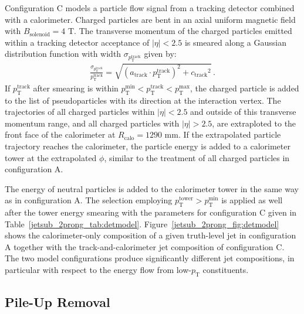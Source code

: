 \documentclass[11pt,letterpaper]{article}
\begin{document}
Configuration C models a particle flow signal from a tracking detector combined with a calorimeter. 
Charged particles are bent in an axial uniform magnetic field with $B_{\text{solenoid}} = 4$ T.
The transverse momentum of the charged particles emitted within a tracking detector acceptance of $|\eta|<2.5$
is smeared along a Gaussian distribution function with width $\sigma_{\ensuremath{p_{\text{T}}^{\text{track}}}}$ given by:
\begin{align}
  \frac{\sigma_{\ensuremath{p_{\text{T}}^{\text{track}}}}}{\ensuremath{p_{\text{T}}^{\text{track}}}} = \sqrt{(\ensuremath{a_{\text{track}}}\cdot\ensuremath{p_{\text{T}}^{\text{track}}})^{2} + \ensuremath{c_{\text{track}}}^{2}}\,.
  \label{jetsub_2prong_eq:trkreso}
\end{align} 
If \ensuremath{p_{\text{T}}^{\text{track}}}{} after smearing is within $\ensuremath{p_{\text{T}}^{\text{min}}} < \ensuremath{p_{\text{T}}^{\text{track}}} < \ensuremath{p_{\text{T}}^{\text{max}}}$, the charged particle is added to the list of pseudoparticles with its direction at the interaction vertex. 
The trajectories of all charged particles within $|\eta| < 2.5$ and outside of this transverse momentum range, 
and all charged particles with $|\eta| > 2.5$, are extraploted to the front face of the calorimeter at $R_{\text{calo}} = 1290$ mm.
If the extrapolated particle trajectory reaches the calorimeter, the particle energy is added to a calorimeter tower at the extrapolated $\phi$, similar to the treatment of all charged particles in configuration A.

The energy of neutral particles is added to the calorimeter tower in the same way as in configuration A. 
The selection employing $\ensuremath{p_{\text{T}}^{\text{tower}}} > \ensuremath{p_{\text{T}}^{\text{min}}}$ is applied as well after the tower energy smearing with the parameters for configuration C given in Table~\ref{jetsub_2prong_tab:detmodel}. 
Figure~\ref{jetsub_2prong_fig:detmodel} shows the calorimeter-only composition of a given truth-level jet in configuration A together with the track-and-calorimeter jet composition of configuration C.
The two model configurations produce significantly different jet compositions, in particular with respect to the energy flow from low-\ensuremath{p_{\text{T}}}{} constituents.










\subsection{Pile-Up Removal}\label{jetsub_2prong_sec:pu_tech}
\end{document}
